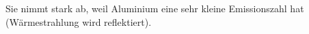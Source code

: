 Sie nimmt stark ab, weil Aluminium eine sehr kleine Emissionszahl hat (Wärmestrahlung wird reflektiert).
